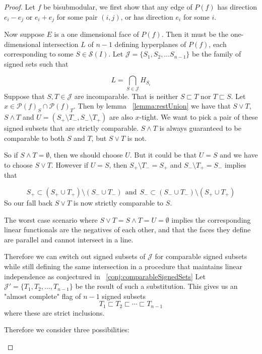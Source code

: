 \documentclass[12pt]{amsart}
\numberwithin{equation}{section}
\newcommand{\pp}{\mathcal{P}}
\newcommand{\si}{\mathcal{S}}
\newcommand{\J}{\mathcal{J}}
\begin{document}
\begin{proof}


 Let $f$ be bisubmodular, we first show that any edge of $P(f)$ has direction $e_i-e_j$ or 
  $e_i+e_j$ for some pair $(i,j)$, or has direction $e_i$ 
for some $i$. 

Now suppose $E$ is a one dimensional face of $P(f)$. Then it must be the one-dimensional intersection  $L$
of $n-1$ defining hyperplanes of $P(f)$, each corresponding to some $S\in \si(I)$.
Let $\J=\{ S_1, S_2, \dots S_{n-1} \}$ be the family of signed sets such that 

$$L=\bigcap_{S\in \J} H_{S_i}$$
Suppose that $S,T\in \J$ are incomparable.  That is neither $S\sqsubset T$ nor $T\sqsubset S$.  Let $x \in \pp(f)_S \cap \pp(f)_T $. 
Then by lemma ~\ref{lemma:restUnion} 							
we have that $S\vee T$, $S\wedge T$ and $U = (S_+\setminus T_- , S_-\setminus T_+)$ are also $x$-tight.  We want to pick a pair of these
signed subsets that are strictly comparable.  $S\wedge T$ is always guaranteed to be comparable to both $S$ and $T$, but $S\vee T$ is
not. 


So if $S\wedge T=\emptyset$, then we should choose $U$.  But it could be that $U =S $ and we have to choose  $S\vee T$. 
However if $U=S$, then $S_+\setminus T_-= S_+ $ and $S_-\setminus T_+ = S_-$ implies that 

$$  S_+ \subset (S_+\cup T_+ )\setminus (S_-\cup T_-) \ \ \text{and} \ \ S_- \subset   (S_-\cup T_-)\setminus (S_+\cup T_+ ) $$ 
So our fall back $S\vee T$  is now strictly comparable to $S$.   

The worst case scenario where $S\vee T = S\wedge T = U = \emptyset$ implies the corresponding linear functionals are the 
negatives of each other, and that the faces they define are parallel and cannot intersect in a line.  

Therefore we can switch out signed subsets of $\J$ for comparable signed subsets while still defining the same intersection
in a procedure that maintains linear independence as conjectured in ~\ref{conj:comparableSignedSets}
Let $\J' = \{ T_1, T_2, \dots , T_{n-1}\}$ be the result of such a substitution.   
This gives us an "almost complete" flag of $n-1$ signed subsets 
$$ T_1 \sqsubset T_2 \sqsubset \cdots \sqsubset T_{n-1}$$
where these are strict inclusions. 

 Therefore we consider three possibilities: 
 \begin{enumerate}[i]
 

\end{enumerate}
\end{proof}
\end{document}
